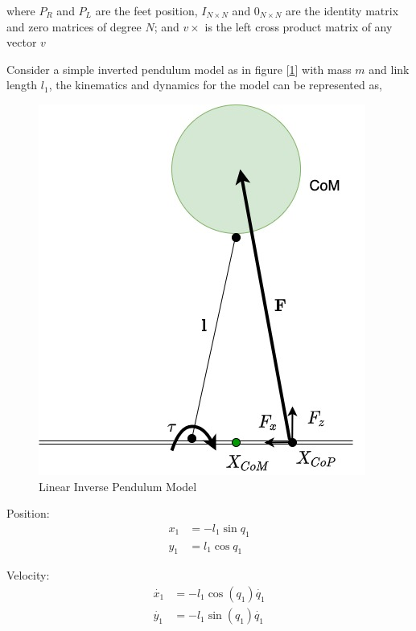 where $P_R$ and $P_L$ are the feet position, $I_{N \times N}$ and $0_{N \times N}$ are the identity matrix and zero matrices of degree $N$; and $v\times$ is the left cross product matrix of any vector $v$


Consider a simple inverted pendulum model as in figure [\ref{ipm}] with mass $m$ and link length $l_1$, the kinematics and dynamics for the model can be represented as,

\begin{figure}[h!]
    \centering
    \includegraphics[scale=.5]{images/LIP.jpg}\hfill
    \caption{Linear Inverse Pendulum Model}\hfill
    \label{ipm}
\end{figure}

Position:
\begin{equation}
\begin{split}
    x_1 &= -l_1\sin{q_1} \\
    y_1 &= l_1\cos{q_1}
\end{split}
\end{equation}

Velocity:
\begin{equation}
\begin{split}
    \Dot{x_1} &= -l_1\cos({q_1})\Dot{q_1} \\
    \Dot{y_1} &= -l_1\sin({q_1})\Dot{q_1}
\end{split}
\end{equation}

